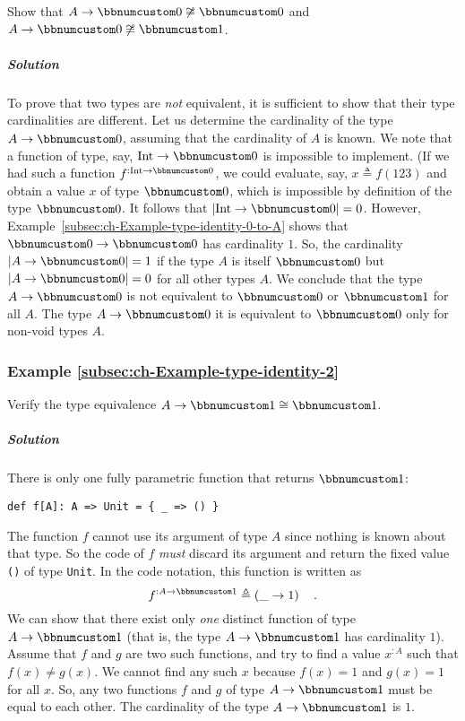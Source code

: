 Show that $A\rightarrow\bbnum 0\not\cong\bbnum 0$ and $A\rightarrow\bbnum 0\not\cong\bbnum 1$.

\subparagraph{Solution}

To prove that two types are \emph{not} equivalent, it is sufficient
to show that their type cardinalities are different. Let us determine
the cardinality of the type $A\rightarrow\bbnum 0$, assuming that
the cardinality of $A$ is known. We note that a function of type,
say, $\text{Int}\rightarrow\bbnum 0$ is impossible to implement.
(If we had such a function $f^{:\text{Int}\rightarrow\bbnum 0}$,
we could evaluate, say, $x\triangleq f(123)$ and obtain a value $x$
of type $\bbnum 0$, which is impossible by definition of the type
$\bbnum 0$. It follows that $\left|\text{Int}\rightarrow\bbnum 0\right|=0$.
However, Example~\ref{subsec:ch-Example-type-identity-0-to-A} shows
that $\bbnum 0\rightarrow\bbnum 0$ has cardinality $1$. So, the
cardinality $\left|A\rightarrow\bbnum 0\right|=1$ if the type $A$
is itself $\bbnum 0$ but $\left|A\rightarrow\bbnum 0\right|=0$ for
all other types $A$. We conclude that the type $A\rightarrow\bbnum 0$
is not equivalent to $\bbnum 0$ or $\bbnum 1$ for all $A$. The
type $A\rightarrow\bbnum 0$ it is equivalent to $\bbnum 0$ only
for non-void types $A$.

\subsubsection{Example \label{subsec:ch-Example-type-identity-2}\ref{subsec:ch-Example-type-identity-2}}

Verify the type equivalence $A\rightarrow\bbnum 1\cong\bbnum 1$.

\subparagraph{Solution}

There is only one fully parametric function that returns $\bbnum 1$:
\begin{lstlisting}
def f[A]: A => Unit = { _ => () }
\end{lstlisting}
The function $f$ cannot use its argument of type $A$ since nothing
is known about that type. So the code of $f$ \emph{must} discard
its argument and return the fixed value \lstinline!()! of type \lstinline!Unit!.
In the code notation, this function is written as
\[
f^{:A\rightarrow\bbnum 1}\triangleq\left(\_\rightarrow1\right)\quad.
\]
We can show that there exist only \emph{one} distinct function of
type $A\rightarrow\bbnum 1$ (that is, the type $A\rightarrow\bbnum 1$
has cardinality $1$). Assume that $f$ and $g$ are two such functions,
and try to find a value $x^{:A}$ such that $f(x)\neq g(x)$. We cannot
find any such $x$ because $f(x)=1$ and $g(x)=1$ for all $x$. So,
any two functions $f$ and $g$ of type $A\rightarrow\bbnum 1$ must
be equal to each other. The cardinality of the type $A\rightarrow\bbnum 1$
is $1$.

